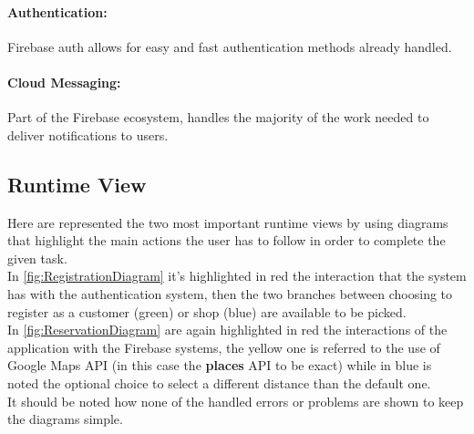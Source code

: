 \paragraph{Authentication:} Firebase auth allows for easy and fast authentication methods already handled.
\paragraph{Cloud Messaging:} Part of the Firebase ecosystem, handles the majority of the work needed to deliver notifications to users.
\clearpage
\subsection{Runtime View}
Here are represented the two most important runtime views by using diagrams that highlight the main actions the user has to follow in order to complete the given task.\\
In \autoref{fig:RegistrationDiagram} it's highlighted in red the interaction that the system has with the authentication system, then the two branches between choosing to register as a customer (green) or shop (blue) are available to be picked.\\
In \autoref{fig:ReservationDiagram} are again highlighted in red the interactions of the application with the Firebase systems, the yellow one is referred to the use of Google Maps API (in this case the \textbf{places} API to be exact) while in blue is noted the optional choice to select a different distance than the default one.\\
It should be noted how none of the handled errors or problems are shown to keep the diagrams simple.

